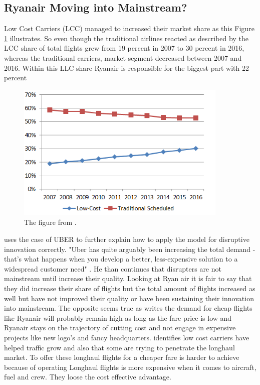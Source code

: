 \documentclass[a4paper, 11pt]{article}
\begin{document}
\subsection{Ryanair Moving into Mainstream?}
\label{limits}


Low Cost Carriers (LCC) managed to increased their market share as this Figure \ref{fig:graph2} illustrates. So even though the traditional airlines reacted as described by \citep{Dennis} the LCC share of total flights grew from 19 percent in 2007 to 30 percent in 2016, whereas the traditional carriers, market segment decreased between 2007 and 2016. Within this LLC share Ryanair is responsible for the biggest part with 22 percent \citep{Eurocontrol2017}

\begin{figure}[h!]
    \centering
    \includegraphics[width=0.9\textwidth]{evolution-lcc-vs-tradsched.png}
    \caption{The figure from \cite{Eurocontrol2017}.}
    \label{fig:graph2}
\end{figure}

\citep{Christensen2015} uses the case of UBER to further explain how to apply the model for disruptive innovation correctly. "Uber has quite arguably been increasing the total demand - that's what happens when you develop a better, less-expensive solution to a widespread customer need" \citep[p. 4]{Christensen2015}. He than continues that disrupters are not mainstream until increase their quality. Looking at Ryan air it is fair to say that they did increase their share of flights but the total amount of flights increased as well \citep{Eurocontrol2018} but have not improved their quality or have been sustaining their innovation into mainstream. The opposite seems true as \citep{Barrett} writes the demand for cheap flights like Ryanair will probably remain high as long as the fare price is low and Ryanair stays on the trajectory of cutting cost and not engage in expensive projects like new logo's and fancy headquarters. \cite{Eurocontrol2018} identifies low cost carriers have helped traffic grow and also that some are trying to penetrate the longhaul market. To offer these longhaul flights for a cheaper fare is harder to achieve because of operating Longhaul flights is more expensive when it comes to aircraft, fuel and crew. They loose the cost effective advantage.
\end{document}

